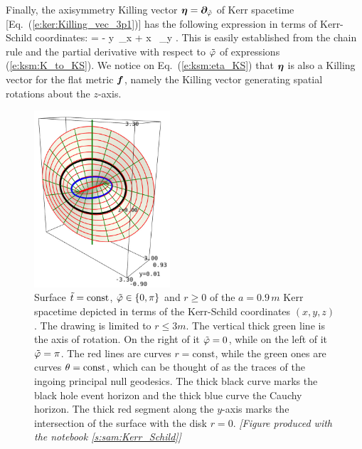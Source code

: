 Finally, the axisymmetry Killing vector $\bm{\eta} = \bm{\partial}_{\tilde\varphi}$
of Kerr spacetime [Eq.~(\ref{e:ker:Killing_vec_3p1})] has the following
expression in terms of Kerr-Schild coordinates:
\be \label{e:ksm:eta_KS}
    \w{\eta} = - y\, \wpar_x + x \, \wpar_y .
\ee
This is easily established from the chain rule and the partial
derivative with respect to ${\tilde\varphi}$ of expressions (\ref{e:ksm:K_to_KS}).
We notice on Eq.~(\ref{e:ksm:eta_KS}) that $\bm{\eta}$ is also a Killing vector for the flat metric $\bm{f}$,
namely the Killing vector generating spatial rotations about the $z$-axis.

\begin{figure}
\centerline{\includegraphics[width=0.45\textwidth]{ksm_phi_cut.jpg}}
\caption[]{\label{f:ksm:phi_cut} \footnotesize
Surface ${\tilde t}=\mathrm{const}$, ${\tilde\varphi}\in\{0,\pi\}$ and $r\geq 0$ of the $a=0.9\, m$
Kerr spacetime
depicted in terms of
the Kerr-Schild coordinates $(x,y,z)$.
The drawing is limited to $r\leq 3 m$.
The vertical thick green line is
the axis of rotation. On the right of it ${\tilde\varphi}=0$, while on the left
of it ${\tilde\varphi}=\pi$.
The red lines are curves $r=\mathrm{const}$,
while the green ones are curves $\theta=\mathrm{const}$, which can be thought of as
the traces of the ingoing principal null geodesics.
The thick black curve marks the black hole event horizon and the thick blue curve the Cauchy horizon.
The thick red segment along the $y$-axis
marks the intersection of the surface with the disk $r=0$.
\textsl{[Figure produced with the notebook \ref{s:sam:Kerr_Schild}]}
}
\end{figure}




